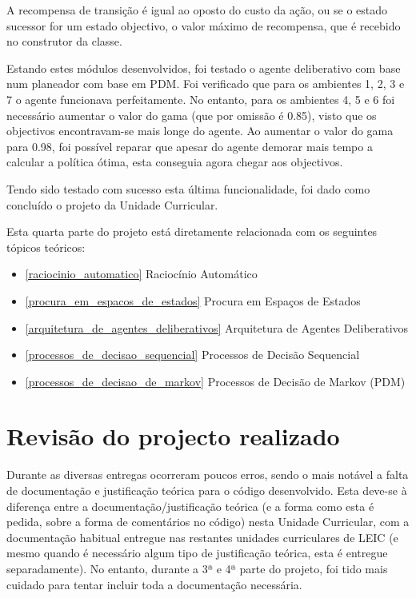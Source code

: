 \documentclass[a4paper,12pt]{article}
\begin{document}
A recompensa de transição é igual ao oposto do custo da ação, ou se o estado sucessor for um estado objectivo, o valor máximo de recompensa, que é recebido no construtor da classe.

Estando estes módulos desenvolvidos, foi testado o agente deliberativo com base num planeador com base em PDM. Foi verificado que para os ambientes 1, 2, 3 e 7 o agente funcionava perfeitamente. No entanto, para os ambientes 4, 5 e 6 foi necessário aumentar o valor do gama (que por omissão é 0.85), visto que os objectivos encontravam-se mais longe do agente. Ao aumentar o valor do gama para 0.98, foi possível reparar que apesar do agente demorar mais tempo a calcular a política ótima, esta conseguia agora chegar aos objectivos.

Tendo sido testado com sucesso esta última funcionalidade, foi dado como concluído o projeto da Unidade Curricular.

Esta quarta parte do projeto está diretamente relacionada com os seguintes tópicos teóricos:
\begin{itemize}
	\item \ref{raciocinio_automatico} Raciocínio Automático
	\item \ref{procura_em_espacos_de_estados} Procura em Espaços de Estados
	\item \ref{arquitetura_de_agentes_deliberativos} Arquitetura de Agentes Deliberativos
	\item \ref{processos_de_decisao_sequencial} Processos de Decisão Sequencial
	\item \ref{processos_de_decisao_de_markov} Processos de Decisão de Markov (PDM)
\end{itemize}

\newpage
\section{Revisão do projecto realizado}
Durante as diversas entregas ocorreram poucos erros, sendo o mais notável a falta de documentação e justificação teórica para o código desenvolvido. Esta deve-se à diferença entre a documentação/justificação teórica (e a forma como esta é pedida, sobre a forma de comentários no código) nesta Unidade Curricular, com a documentação habitual entregue nas restantes unidades curriculares de LEIC (e mesmo quando é necessário algum tipo de justificação teórica, esta é entregue separadamente). No entanto, durante a 3ª e 4ª parte do projeto, foi tido mais cuidado para tentar incluir toda a documentação necessária.
\end{document}
